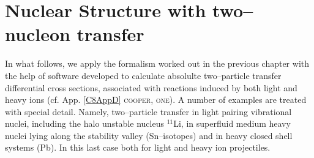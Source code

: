  \chapter[Structure with two neutrons]{Nuclear Structure with two--nucleon transfer}\label{C8}
 In what follows, we apply the formalism worked out in the previous chapter with the help of software developed to calculate absolulte two--particle transfer differential cross sections, associated with reactions induced by both light and heavy ions (cf. App. \ref{C8AppD} \textsc{cooper}, \textsc{one}).
 A number of examples are treated with special detail. Namely, two--particle transfer in light pairing vibrational nuclei, including the halo unstable nucleus $^{11}$Li, in superfluid medium heavy nuclei lying along the stability valley (Sn--isotopes) and in heavy closed shell  systems (Pb). In this last case both for  light and heavy ion projectiles.
